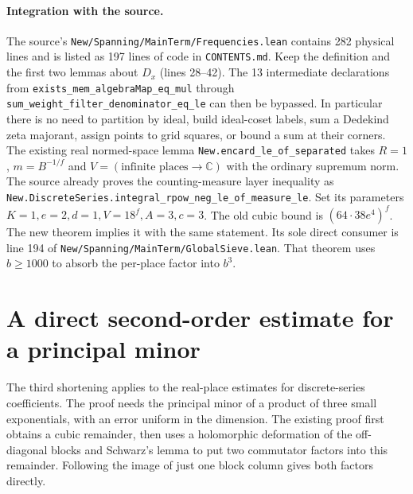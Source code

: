 \documentclass[11pt,letterpaper]{article}
\begin{document}
\paragraph{Integration with the source.}
The source's \texttt{New/Spanning/MainTerm/Frequencies.lean} contains
282 physical lines and is listed as 197 lines of code in
\texttt{CONTENTS.md}. Keep the definition and the first two lemmas
about $D_x$ (lines 28--42). The 13 intermediate declarations from
\texttt{exists\_mem\_algebraMap\_eq\_mul} through
\texttt{sum\_weight\_filter\_denominator\_eq\_le} can then be bypassed.
In particular there is no need to partition by ideal, build ideal-coset
labels, sum a Dedekind zeta majorant, assign points to grid squares, or
bound a sum at their corners. The existing real normed-space lemma
\texttt{New.encard\_le\_of\_separated} takes $R=1$, $m=B^{-1/f}$ and
$V=(\text{infinite places}\to\mathbb C)$ with the ordinary supremum norm.
The source already proves the counting-measure layer inequality as
\texttt{New.DiscreteSeries.integral\_rpow\_neg\_le\_of\_measure\_le}.
Set its parameters $K=1,e=2,d=1,V=18^f,A=3,c=3$.
The old cubic bound is $(64\cdot38e^4)^f$. The new theorem implies it
with the same statement. Its sole direct consumer is line 194 of
\texttt{New/Spanning/MainTerm/GlobalSieve.lean}. That theorem uses
$b\ge1000$ to absorb the per-place factor into $b^3$.

\section{A direct second-order estimate for a principal minor}
\label{sec:minor-flow}

The third shortening applies to the real-place estimates for discrete-series coefficients.
The proof needs the principal minor of a product of three small exponentials, with an error uniform in the dimension.
The existing proof first obtains a cubic remainder, then uses a holomorphic deformation of the off-diagonal blocks and Schwarz's lemma to put two commutator factors into this remainder.
Following the image of just one block column gives both factors directly.
\end{document}
